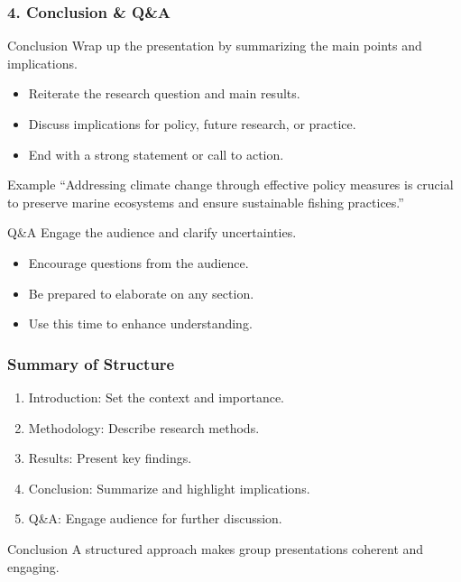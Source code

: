 \documentclass[aspectratio=169]{beamer}
\begin{document}
\begin{frame}[fragile]
    \frametitle{4. Conclusion \& Q\&A}
    \begin{block}{Conclusion}
        Wrap up the presentation by summarizing the main points and implications.
    \end{block}
    \begin{itemize}
        \item Reiterate the research question and main results.
        \item Discuss implications for policy, future research, or practice.
        \item End with a strong statement or call to action.
    \end{itemize}
    \begin{block}{Example}
        “Addressing climate change through effective policy measures is crucial to preserve marine ecosystems and ensure sustainable fishing practices.”
    \end{block}

    \begin{block}{Q\&A}
        Engage the audience and clarify uncertainties.
    \end{block}
    \begin{itemize}
        \item Encourage questions from the audience.
        \item Be prepared to elaborate on any section.
        \item Use this time to enhance understanding.
    \end{itemize}
\end{frame}

\begin{frame}[fragile]
    \frametitle{Summary of Structure}
    \begin{enumerate}
        \item Introduction: Set the context and importance.
        \item Methodology: Describe research methods.
        \item Results: Present key findings.
        \item Conclusion: Summarize and highlight implications.
        \item Q\&A: Engage audience for further discussion.
    \end{enumerate}
    \begin{block}{Conclusion}
        A structured approach makes group presentations coherent and engaging.
    \end{block}
\end{frame}
\end{document}
